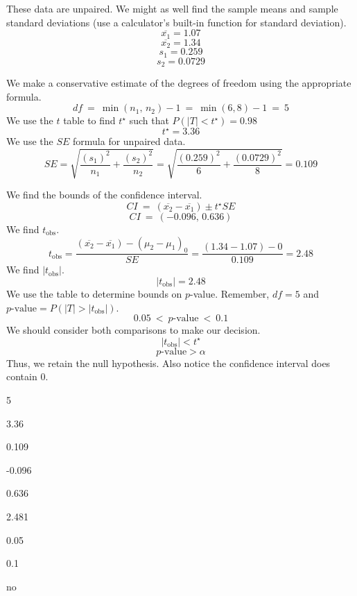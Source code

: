 \begin{solution}
These data are unpaired. We might as well find the sample means and
sample standard deviations (use a calculator's built-in function for
standard deviation). \[\overline{x_1} = 1.07 \]
\[\overline{x_2} = 1.34 \] \[s_1 = 0.259 \] \[s_2 = 0.0729 \]

We make a conservative estimate of the degrees of freedom using the
appropriate formula. \[df ~=~ \min(n_1,\,n_2)-1 ~=~ \min(6,8)-1 ~=~ 5 \]
We use the \(t\) table to find \(t^\star\) such that
\(P(|T|<t^\star) = 0.98\) \[t^\star = 3.36 \] We use the \(SE\) formula
for unpaired data.
\[SE = \sqrt{\frac{(s_1)^2}{n_1}+\frac{(s_2)^2}{n_2}} =
\sqrt{\frac{(0.259)^2}{6}+\frac{(0.0729)^2}{8}} = 0.109 \] 

We find the
bounds of the confidence interval.
\[CI ~=~ (\overline{x_2}-\overline{x_1})\pm t^{\star} SE\]
\[CI ~=~ (-0.096,\, 0.636) \] We find \(t_\text{obs}\).
\[t_\text{obs} = \frac{(\overline{x_2}-\overline{x_1})-(\mu_2-\mu_1)_0}{SE} = \frac{(1.34-1.07)-0}{0.109} = 2.48\]
We find \(|t_\text{obs}|\). \[|t_\text{obs}| = 2.48 \] We use the table
to determine bounds on \(p\)-value. Remember, \(df=5\) and
\(p\text{-value} = P(|T|>|t_\text{obs}|)\).
\[0.05 ~<~ p\text{-value} ~<~ 0.1\] We should consider both comparisons
to make our decision. \[|t_\text{obs}| < t^{\star} \]
\[p\text{-value} > \alpha \] Thus, we retain the null hypothesis. Also
notice the confidence interval does contain 0.
\begin{answerlist}
  \item 5
  \item 3.36
  \item 0.109
  \item -0.096
  \item 0.636
  \item 2.481
  \item 0.05
  \item 0.1
  \item no
\end{answerlist}
\end{solution}

